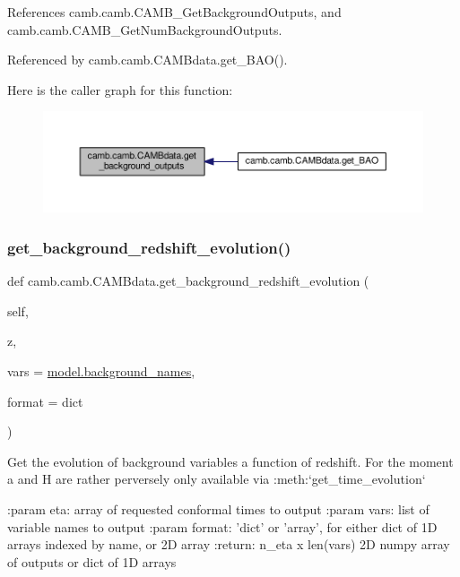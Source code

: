 References camb.\+camb.\+C\+A\+M\+B\+\_\+\+Get\+Background\+Outputs, and camb.\+camb.\+C\+A\+M\+B\+\_\+\+Get\+Num\+Background\+Outputs.



Referenced by camb.\+camb.\+C\+A\+M\+Bdata.\+get\+\_\+\+B\+A\+O().

Here is the caller graph for this function\+:
\nopagebreak
\begin{figure}[H]
\begin{center}
\leavevmode
\includegraphics[width=350pt]{classcamb_1_1camb_1_1CAMBdata_a16b60e35b6ec458d66db2895ada43acb_icgraph}
\end{center}
\end{figure}
\mbox{\label{classcamb_1_1camb_1_1CAMBdata_a29f3b8fde294834832ea19680e254d31}} 
\subsubsection{\texorpdfstring{get\+\_\+background\+\_\+redshift\+\_\+evolution()}{get\_background\_redshift\_evolution()}}
{\footnotesize\ttfamily def camb.\+camb.\+C\+A\+M\+Bdata.\+get\+\_\+background\+\_\+redshift\+\_\+evolution (\begin{DoxyParamCaption}\item[{}]{self,  }\item[{}]{z,  }\item[{}]{vars = {\ttfamily \mbox{\hyperlink{namespacecamb_1_1model_ad21210b2a1480586c2da0e821e0f5dfb}{model.\+background\+\_\+names}}},  }\item[{}]{format = {\ttfamily \textquotesingle{}dict\textquotesingle{}} }\end{DoxyParamCaption})}

\begin{DoxyVerb}Get the evolution of background variables a function of redshift.
For the moment a and H are rather perversely only available via :meth:`get_time_evolution`

:param eta: array of requested conformal times to output
:param vars: list of variable names to output
:param format: 'dict' or 'array', for either dict of 1D arrays indexed by name, or 2D array
:return: n_eta x len(vars) 2D numpy array of outputs or dict of 1D arrays
\end{DoxyVerb}
 

